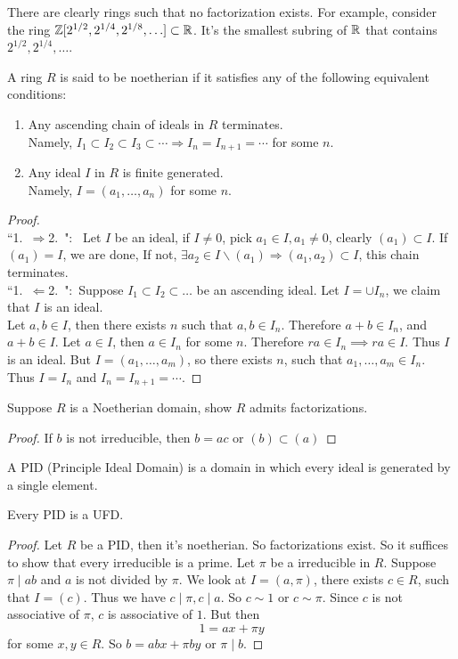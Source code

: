 \documentclass{mynotes}
\begin{document}
\begin{remark}
There are clearly rings such that no factorization exists. For example, consider the ring $\mathbb{Z}[2^{1/2},2^{1/4},2^{1/8},\ldots]\subset \mathbb{R}$. It's the smallest subring of $\mathbb{R}$ that contains $2^{1/2},2^{1/4},\ldots$.
\end{remark}
\begin{definition}
A ring $R$ is said to be noetherian if it satisfies any of the following equivalent conditions:
\begin{enumerate}
\item Any ascending chain of ideals in $R$ terminates.\\
Namely, $I_1\subset I_2\subset I_3\subset \cdots\Rightarrow I_n = I_{n+1}=\cdots$ for some $n$.
\item Any ideal $I$ in $R$ is finite generated.\\
Namely, $I=(a_1,\ldots,a_n)$ for some $n$.
\end{enumerate}
\end{definition}
\begin{proof}
\mbox{}\\\mbox{``1.\ $\Rightarrow$2.\ ": } Let $I$ be an ideal, if $I\ne0$, pick $a_1\in I, a_1\neq 0$, clearly $(a_1)\subset I$. 
If $(a_1)=I$, we are done, If not,
$\exists a_2\in I\backslash(a_1)\Rightarrow (a_1,a_2)\subset I $, this chain terminates.\\
\mbox{``1.\ $\Leftarrow$2.\ ": }Suppose $I_1\subset I_2\subset \ldots$ be an ascending ideal. Let $I = \cup I_n$, we claim that $I$ is an ideal.\\
Let $a,b\in I$, then there exists $n$ such that $a,b\in I_n$. Therefore $a+b\in I_n$, and $a+b\in I$. Let $a\in I$, then $a\in I_n$ for some $n$. Therefore $ra\in I_n\implies ra\in I$. Thus $I$ is an ideal. But $I=(a_1,\ldots,a_m)$, so there exists $n$, such that $a_1,\ldots,a_m\in I_n$. Thus $I=I_n$ and $I_n=I_{n+1}=\cdots$.
\end{proof}
\begin{exercise}
Suppose $R$ is a Noetherian domain, show $R$ admits factorizations.
\end{exercise}
\begin{proof}
If $b$ is not irreducible, then $b=ac$ or $(b)\subset(a)$\notcomplete
\end{proof}
\begin{definition}
A PID (Principle Ideal Domain) is a domain in which every ideal is generated by a single element.
\end{definition}
\begin{theorem}
Every PID is a UFD.
\end{theorem}
\begin{proof}
Let $R$ be a PID, then it's noetherian. So factorizations exist. So it suffices to show that every irreducible is a prime. Let $\pi$ be a irreducible in $R$. Suppose $\pi\mid ab$ and $a$ is not divided by $\pi$. We look at $I=(a,\pi)$, there exists $c\in R$, such that $I=(c)$. Thus we have $c\mid \pi, c\mid a$. So $c\sim 1$ or $c\sim \pi$. Since $c$ is not associative of $\pi$, $c$ is associative of $1$. But then $$1=ax+\pi y$$ for some $x,y\in R$. So $b=abx+\pi by$ or $\pi\mid b$.
\end{proof}
\end{document}
